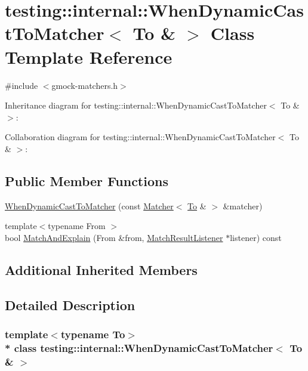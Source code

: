\hypertarget{classtesting_1_1internal_1_1_when_dynamic_cast_to_matcher_3_01_to_01_6_01_4}{}\section{testing\+:\+:internal\+:\+:When\+Dynamic\+Cast\+To\+Matcher$<$ To \& $>$ Class Template Reference}
\label{classtesting_1_1internal_1_1_when_dynamic_cast_to_matcher_3_01_to_01_6_01_4}


{\ttfamily \#include $<$gmock-\/matchers.\+h$>$}



Inheritance diagram for testing\+:\+:internal\+:\+:When\+Dynamic\+Cast\+To\+Matcher$<$ To \& $>$\+:


Collaboration diagram for testing\+:\+:internal\+:\+:When\+Dynamic\+Cast\+To\+Matcher$<$ To \& $>$\+:
\subsection*{Public Member Functions}
\begin{DoxyCompactItemize}
\item 
\hyperlink{classtesting_1_1internal_1_1_when_dynamic_cast_to_matcher_3_01_to_01_6_01_4_a5f292f9497d2da8484082cba38053908}{When\+Dynamic\+Cast\+To\+Matcher} (const \hyperlink{classtesting_1_1_matcher}{Matcher}$<$ \hyperlink{classtesting_1_1internal_1_1_to}{To} \& $>$ \&matcher)
\item 
{\footnotesize template$<$typename From $>$ }\\bool \hyperlink{classtesting_1_1internal_1_1_when_dynamic_cast_to_matcher_3_01_to_01_6_01_4_a5459ff45c7b687d42545490226c2f7b2}{Match\+And\+Explain} (From \&from, \hyperlink{classtesting_1_1_match_result_listener}{Match\+Result\+Listener} $\ast$listener) const 
\end{DoxyCompactItemize}
\subsection*{Additional Inherited Members}


\subsection{Detailed Description}
\subsubsection*{template$<$typename To$>$\\*
class testing\+::internal\+::\+When\+Dynamic\+Cast\+To\+Matcher$<$ To \& $>$}




